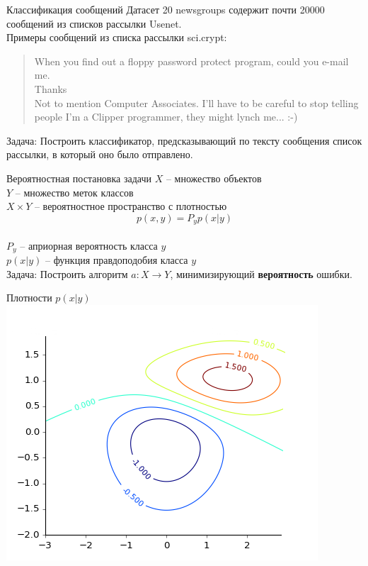 \documentclass[10pt]{beamer}
\begin{document}
{
\begin{frame} {Классификация сообщений}
  Датасет \alert{20 newsgroups} содержит почти 20000 сообщений из списков рассылки Usenet.\\
  \pause
  \bigbreak
  Примеры сообщений из списка рассылки sci.crypt:\\
  \begin{quotation}
    When you find out a floppy password protect program, could you e-mail me.\\
    Thanks\\
    \bigbreak
    Not to mention Computer Associates. I'll have to be careful to stop telling people I'm a Clipper programmer, they might lynch me... :-)
  \end{quotation}
  \pause
  \alert{Задача}: Построить классификатор, предсказывающий по тексту сообщения список рассылки, в который оно было отправлено.
\end{frame}
}

{
\begin{frame} {Вероятностная постановка задачи}
  $X$ -- множество объектов\\
  $Y$ -- множество меток классов\\
  $X \times Y$ -- вероятностное пространство с плотностью \\
  $$p(x,y) = P_yp(x|y)$$\\
  \bigbreak
  $P_y$ -- априорная вероятность класса $y$\\
  $p(x|y)$ -- функция правдоподобия класса $y$\\
  \bigbreak
  \pause
  \alert{Задача}: Построить алгоритм $a: X \rightarrow Y$, минимизирующий \textbf{вероятность} ошибки.
\end{frame}
}

\begin{frame} {Плотности $p(x|y)$}
  \centering
  \includegraphics[width=0.9 \textwidth, height=0.9 \textheight, keepaspectratio]{images/density}
\end{frame}
\end{document}

